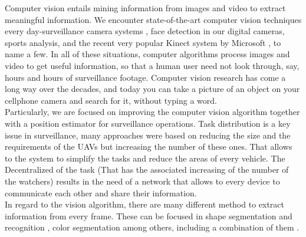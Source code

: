 Computer vision entails mining information from images and video to extract meaningful information. We encounter state-of-the-art computer vision techniques every day-surveillance camera systems \cite{traffic_surveillance_pergamon} \cite{distributed_surveillance} \cite{vehicle_detection}, face detection in our digital cameras, sports analysis, and the recent very popular Kinect system by Microsoft \cite{Kinect_intro}, to name a few. In all of these situations, computer algorithms process images and video to get useful information, so that a human user need not look through, say, hours and hours of surveillance footage. Computer vision research has come a long way over the decades, and today you can take a picture of an object on your cellphone camera and search for it, without typing a word. \\

Particularly, we are focused on improving the computer vision algorithm together with a position estimator for surveillance operations. Task distribution \cite{Coop_Surv_aerial_JJ} \cite{Consensus_reaching_Xiao} \cite{Adaptative_tast_Meuth} \cite{distributed_architecture_Ivan_Maza}  is a key issue in surveillance, many approaches were based on reducing the size and the requirements of the UAVs but increasing the number of these ones. That allows to the system to simplify the tasks and reduce the areas of every vehicle. The Decentralized of the task \cite{descentralized_task_UAV} (That has the associated increasing of the number of the watchers) results in the need of a network that allows to every device to communicate each other and share their information. \\

In regard to the vision algorithm, there are many different method to extract information from every frame. These can be focused in shape segmentation and recognition \cite{shape_using_shape_context} \cite{Vehicle_recog_markov}, color segmentation \cite{} among others, including a combination of them \cite{realtime_signal_recon_shape_color} \cite{signal_recogn_shape_color} \cite{Robust_RT_tracking_color_face_Darrell}.


